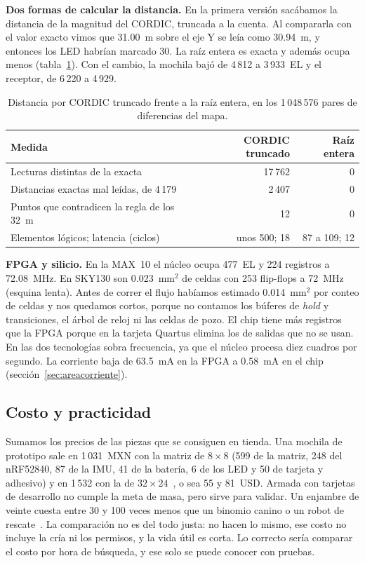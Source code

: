 \textbf{Dos formas de calcular la distancia.} En la primera versión sacábamos la distancia de la magnitud del CORDIC, truncada a la cuenta. Al compararla con el valor
exacto vimos que 31.00~m sobre el eje Y se leía como 30.94~m, y entonces los LED habrían marcado 30. La raíz entera es exacta
y además ocupa menos (tabla~\ref{tab:distancias}). Con el cambio, la mochila bajó de 4\,812 a 3\,933~EL y el receptor, de
6\,220 a 4\,929.

\begin{table}[!htb]
\centering\footnotesize
\caption{Distancia por CORDIC truncado frente a la raíz entera, en los 1\,048\,576 pares de diferencias del mapa.}
\label{tab:distancias}
\begin{tabularx}{0.92\textwidth}{@{}>{\raggedright\arraybackslash}X r r@{}}
\toprule
\rowcolor{TableHead} \textbf{Medida} & \textbf{CORDIC truncado} & \textbf{Raíz entera} \\
\midrule
Lecturas distintas de la exacta & 17\,762 & 0 \\
Distancias exactas mal leídas, de 4\,179 & 2\,407 & 0 \\
Puntos que contradicen la regla de los 32~m & 12 & 0 \\
Elementos lógicos; latencia (ciclos) & unos 500; 18 & 87 a 109; 12 \\
\bottomrule
\end{tabularx}
\end{table}

\textbf{FPGA y silicio.} En la MAX~10 el núcleo ocupa 477~EL y 224 registros a 72.08~MHz. En SKY130 son 0.023~mm$^2$ de celdas con 253 flip-flops a 72~MHz
(esquina lenta). Antes de correr el flujo habíamos estimado 0.014~mm$^2$ por conteo de celdas y nos quedamos cortos, porque no contamos los
búferes de \emph{hold} y transiciones, el árbol de reloj ni las celdas de pozo. El chip tiene más registros que la FPGA
porque en la tarjeta Quartus elimina los de salidas que no se usan. En las dos tecnologías sobra frecuencia, ya que el núcleo
procesa diez cuadros por segundo. La corriente baja de 63.5~mA en la FPGA a 0.58~mA en el chip
(sección~\ref{sec:areacorriente}).

\subsection{Costo y practicidad}

Sumamos los precios de las piezas que se consiguen en tienda. Una mochila de prototipo sale en 1\,031~MXN con la matriz de $8\times8$ (599
de la matriz, 248 del nRF52840, 87 de la IMU, 41 de la batería, 6 de los LED y 50 de tarjeta y adhesivo) y en 1\,532 con la de
$32\times24$~\cite{unit}, o sea 55 y 81~USD. Armada con tarjetas de desarrollo no cumple la meta de masa, pero sirve para validar. Un enjambre de veinte cuesta entre 30 y
100 veces menos que un binomio canino o un robot de rescate~\cite{sdf,murphy2021}. La comparación no es del todo justa: no
hacen lo mismo, ese costo no incluye la cría ni los permisos, y la vida útil es corta. Lo correcto sería comparar el costo
por hora de búsqueda, y ese solo se puede conocer con pruebas.


